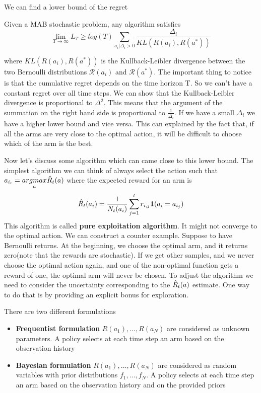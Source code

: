 \documentclass[main.tex]{subfiles}
\begin{document}
We can find a lower bound of the regret
\begin{theorem}
Given a MAB stochastic problem, any algorithm satisfies
\begin{equation}
    \lim_{T \rightarrow \infty} L_T \geq log(T) \sum_{a_i|\Delta_i>0} \frac{\Delta_i}{KL(R(a_i),R(a^*))}
\end{equation}
\end{theorem}
\par \noindent
where $KL(R(a_i),R(a^*))$ is the Kullback-Leibler divergence between the two Bernoulli distributions $\mathcal{R}(a_i)$ and $\mathcal{R}(a^*)$. The important thing to notice is that the cumulative regret depends on the time horizon T. So we can't have a constant regret over all time steps. We can show that the Kullback-Leibler divergence is proportional to $\Delta^2$. This means that the argument of the summation on the right hand side is proportional to $\frac{1}{\Delta_i}$. If we have a small $\Delta_i$ we have a higher lower bound and vice versa. This can explained by the fact that, if all the arms are very close to the optimal action, it will be difficult to choose which of the arm is the best.

Now let's discuss some algorithm which can came close to this lower bound. The simplest algorithm we can think of always select the action such that $a_{i_t} = \underset{a}{argmax} \Hat{R}_t(a)$ where the expected
reward for an arm is
\begin{equation*}
    \Hat{R}_t(a_i) = \frac{1}{N_t(a_i)} \sum_{j=1}^t r_{i,j} \mathbf{1}(a_i = a_{i_j})
\end{equation*}
This algorithm is called \textbf{pure exploitation algorithm}. It might not converge to the optimal action. We can construct a counter example. Suppose to have Bernoulli returns. At the beginning, we choose the optimal arm, and it returns zero(note that the rewards are stochastic). If we get other samples, and we never choose the optimal action again, and one of the non-optimal function gets a reward of one, the optimal arm will never be chosen.
To adjust the algorithm we need to consider the uncertainty corresponding to the $\Hat{R}_t(a)$ estimate. One way to do that is by providing an explicit bonus for exploration.

There are two different formulations
\begin{itemize}
    \item \textbf{Frequentist formulation} $R(a_1), \dots, R(a_N)$ are considered as unknown parameters. A policy selects at each time step an arm based on the observation history
    \item \textbf{Bayesian formulation} $R(a_1), \dots, R(a_N)$ are considered as random variables with prior distributions $f_1,\dots,f_N$. A policy selects at each time step an arm based on the observation history and on the provided priors
\end{itemize}
\end{document}
